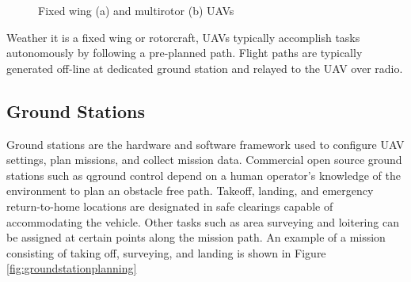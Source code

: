 \documentclass[numbered,pdftex]{ohio-etd}
\begin{document}
\begin{figure}[H]
	\begin{subfigmatrix}{2}%
		\centering	
		\hspace*{0mm}
	\end{subfigmatrix}
	\caption{Fixed wing (a) and multirotor (b) UAVs}
	\label{fig:fixedMultirotor}
\end{figure}


Weather it is a fixed wing or rotorcraft, UAVs typically accomplish tasks autonomously by following a pre-planned path. Flight paths are typically generated off-line at dedicated ground station and relayed to the UAV over radio. 

\subsection{Ground Stations}
Ground stations are the hardware and software framework used to configure UAV settings, plan missions, and collect mission data. Commercial open source ground stations such as qground control depend on a human operator's knowledge of the environment to plan an obstacle free path. Takeoff, landing, and emergency return-to-home locations are designated in safe clearings capable of accommodating the vehicle. Other tasks such as area surveying and loitering can be assigned at certain points along the mission path. An example of a mission consisting of taking off, surveying, and landing is shown in Figure \ref{fig:groundstationplanning}
\end{document}
